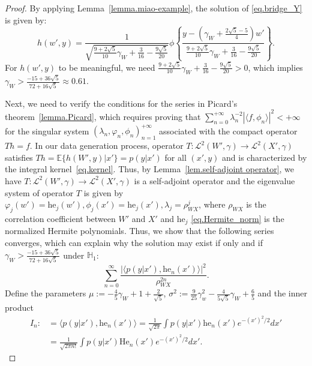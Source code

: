 \documentclass[
  12pt]{article}
\def\mH{\mathbb{H}}
\begin{document}
\begin{proof}
By applying Lemma~\ref{lemma.miao-example}, the solution of \eqref{eq.bridge_Y} is given by:
\begin{equation}\label{eq. true solution_h}
    h(w',y)=\frac{1}{\sqrt{\frac{9+2\sqrt{5}}{10}\gamma_W+\frac{3}{16}-\frac{9\sqrt{5}}{20}}}\phi \left\{ \frac{y-\left( \gamma_W+\frac{2\sqrt{5}-5}{4} \right) w'}{\frac{9+2\sqrt{5}}{10}\gamma_W+\frac{3}{16}-\frac{9\sqrt{5}}{20}} \right\}.
\end{equation}
For $h(w',y)$ to be meaningful, we need $\frac{9+2\sqrt{5}}{10}\gamma_W+\frac{3}{16}-\frac{9\sqrt{5}}{20} > 0$, which implies $\gamma_W>\frac{-15+36\sqrt{5}}{72+16\sqrt{5}}\approx0.61$. 

Next, we need to verify the conditions for the series in Picard's theorem~\ref{lemma.Picard}, which requires proving that $\sum_{n=0}^{+\infty}\lambda_{n}^{-2}|\langle f,\phi_{n}\rangle|^{2}<+\infty $ for the singular system $(\lambda_n,\varphi_n,\phi_{n})_{n=1}^{+\infty}$ associated with the compact operator $Th=f$. In our data generation process, operator $T: \mathcal{L}^2(W',\gamma)\rightarrow  \mathcal{L}^2(X',\gamma)$ satisfies $Th =\mathbb{E}\{ h(W',y)|x'\}=p(y|x')$ for all $(x',y)$ and is characterized by the integral kernel~\eqref{eq.kernel}. Thus, by Lemma~\ref{lem.self-adjoint operator}, we have $T: \mathcal{L}^2(W',\gamma)\rightarrow  \mathcal{L}^2(X',\gamma)$ is a self-adjoint operator and the eigenvalue system of operator $T$ is given by $\varphi_j(w')=\mathrm{he}_{j}(w'),\phi_j(x')=\mathrm{he}_{j}(x'),\lambda_j=\rho_{WX}^{j}$, where $\rho_{WX}$ is the correlation coefficient between $W'$ and $X'$ and $\mathrm{he}_{j}$ \eqref{eq.Hermite_norm} is the normalized Hermite polynomials. Thus, we show that the following series converges, which can explain why the solution may exist if only and if $\gamma_W>\frac{-15+36\sqrt{5}}{72+16\sqrt{5}}$ under $\mH_1$:
$$
\sum_{n=0}^{\infty}{\frac{\left| \langle p( y|x' ) ,\mathrm{he}_n( x' ) \rangle \right|^2}{\rho_{WX}^{2n}}}.
$$
Define the parameters $\mu:= -\frac{4}{5}\gamma_W+1+\frac{2}{\sqrt{5}}$, $\sigma^2:=\frac{9}{25}\gamma_{w}^{2}-\frac{4}{5\sqrt{5}}\gamma_W+\frac{6}{5}$ and the inner product
\begin{align*}
    I_n:&=\langle p(y|x'),\mathrm{he}_n(x')\rangle =\frac{1}{\sqrt{2\pi}}\int{p(y|x')\mathrm{he}_n(x')e^{-(x')^2/2}dx'}\\
    &=\frac{1}{\sqrt{2\pi n!}}\int{p(y|x')\mathrm{He}_n(x')e^{-(x')^2/2}dx'}.
\end{align*}


\end{proof}
\end{document}
